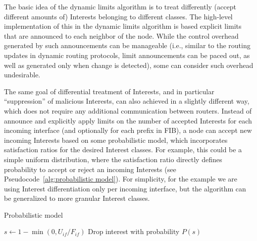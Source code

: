 
The basic idea of the dynamic limits algorithm is to treat differently (accept different amounts of) Interests belonging to different classes.
The high-level implementation of this in the dynamic limits algorithm is based explicit limits that are announced to each neighbor of the node.
While the control overhead generated by such announcements can be manageable (i.e., similar to the routing updates in dynamic routing protocols, limit announcements can be paced out, as well as generated only when change is detected), some can consider such overhead undesirable.

The same goal of differential treatment of Interests, and in particular ``suppression'' of malicious Interests, can also achieved in a slightly different way, which does not require any additional communication between routers.
Instead of announce and explicitly apply limits on the number of accepted Interests for each incoming interface (and optionally for each prefix in FIB), a node can accept new incoming Interests based on some probabilistic model, which incorporates satisfaction ratios for the desired Interest classes.
For example, this could be a simple uniform distribution, where the satisfaction ratio directly defines probability to accept or reject an incoming Interests (see Pseudocode~\ref{alg:probabilistic model}).
For simplicity, for the example we are using Interest differentiation only per incoming interface, but the algorithm can be generalized to more granular Interest classes.



\begin{algorithm}[h]
\caption{Probabilistic model}
\label{alg:probabilistic model}
\begin{algorithmic}[1]


    \State{} 
    \State{} 
    
         
            \State $s \leftarrow 1 - \min(0, U_{if} / F_{if})$
            \State Drop interest with probability $P(s)$
        \EndIf

    \EndFor
\EndFunction

\end{algorithmic}
\end{algorithm}




